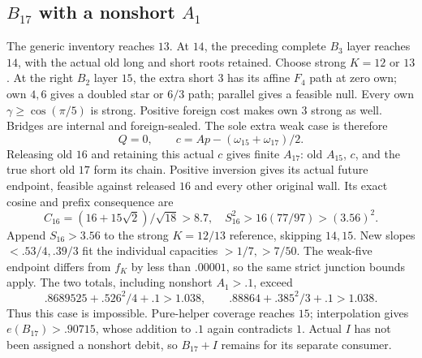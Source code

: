 \documentclass[11pt]{article}
\theoremstyle{definition}
\theoremstyle{remark}
\begin{document}
\subsection[B17 with a nonshort A1]{\(B_{17}\) with a nonshort \(A_1\)}
The generic inventory reaches \(13\).
At \(14\), the preceding complete \(B_3\)
layer reaches \(14\), with the actual
old long and short roots retained.
Choose strong \(K=12\) or \(13\).
At the right \(B_2\) layer \(15\), the
extra short \(3\) has its affine \(F_4\)
path at zero own; own \(4,6\) gives
a doubled star or \(6/3\) path;
parallel gives a feasible null.
Every own \(\gamma\geq\cos(\pi/5)\)
is strong. Positive foreign cost makes
own \(3\) strong as well.
Bridges are internal and foreign-sealed.
The sole extra weak case is therefore
\[
 Q=0,\qquad c=A p-(\omega_{15}+\omega_{17})/2.
\]
Releasing old \(16\) and retaining this
actual \(c\) gives finite \(A_{17}\):
old \(A_{15}\), \(c\), and the true
short old \(17\) form its chain.
Positive inversion gives its actual
future endpoint, feasible against released
\(16\) and every other original wall.
Its exact cosine and prefix consequence are
\[
 C_{16}=(16+15\sqrt2)/\sqrt{18}>8.7,\quad
 S_{16}^2>16(77/97)>(3.56)^2.
\]
Append \(S_{16}>3.56\) to the strong
\(K=12/13\) reference, skipping \(14,15\).
New slopes \(<.53/4,.39/3\) fit the
individual capacities \(>1/7,>7/50\).
The weak-five endpoint differs from
\(f_K\) by less than \(.00001\), so the
same strict junction bounds apply.
The two totals, including nonshort \(A_1>.1\),
exceed
\[
 .8689525+.526^2/4+.1>1.038,\qquad
 .88864+.385^2/3+.1>1.038.
\]
Thus this case is impossible.
Pure-helper coverage reaches \(15\);
interpolation gives \(e(B_{17})>.90715\),
whose addition to \(.1\) again contradicts \(1\).
Actual \(I\) has not been assigned a
nonshort debit, so \(B_{17}+I\) remains
for its separate consumer.


\end{document}
